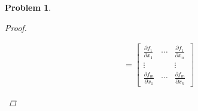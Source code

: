 \documentclass[10pt,a4paper]{article}
\newcounter{theProblemCounter}
\newtheorem{problem}[theProblemCounter]{Problem}
\begin{document}
\begin{problem}
\begin{proof}
\begin{enumerate}
\begin{align*}
&=\begin{bmatrix}\frac{\partial f_1}{\partial x_1} & \cdots & \frac{\partial f_1}{\partial x_n}\\ \vdots& &\vdots \\ \frac{\partial f_m}{\partial x_1} & \cdots & \frac{\partial f_m}{\partial x_n}\end{bmatrix}
\end{align*}
\end{enumerate}
\end{proof}
\end{problem}
\end{document}
